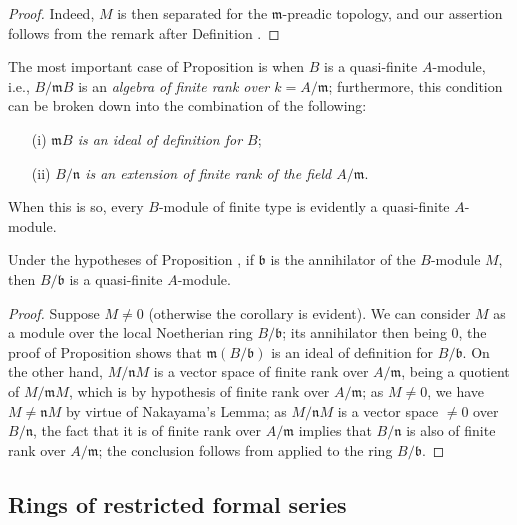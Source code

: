 \begin{proof}
\label{proof-0.7.4.3}
Indeed, $M$ is then separated for the $\mathfrak{m}$-preadic topology, and our assertion
follows from the remark after Definition .
\end{proof}

\begin{env}[7.4.4]
\label{0.7.4.4}
The most important case of Proposition  is when $B$ is a
quasi-finite $A$-module, i.e., $B/\mathfrak{m}B$ is an \emph{algebra of finite rank over
$k=A/\mathfrak{m}$}; furthermore, this condition can be broken down into the combination
of the following:
\begin{enumerate}
  \item[(i)] \emph{$\mathfrak{m}B$ is an ideal of definition for $B$};
  \item[(ii)] \emph{$B/\mathfrak{n}$ is an extension of finite rank of the field $A/\mathfrak{m}$}.
\end{enumerate}
When this is so, every $B$-module of finite type is evidently a quasi-finite $A$-module.
\end{env}

\begin{corollary}[7.4.5]
\label{0.7.4.5}
Under the hypotheses of Proposition , if
$\mathfrak{b}$ is the annihilator of the $B$-module $M$, then $B/\mathfrak{b}$ is a
quasi-finite $A$-module.
\end{corollary}

\begin{proof}
\label{proof-0.7.4.5}
Suppose $M\neq 0$ (otherwise the corollary is evident). We can consider $M$ as a
module over the local Noetherian ring $B/\mathfrak{b}$; its annihilator then being
$0$, the proof of Proposition  shows that
$\mathfrak{m}(B/\mathfrak{b})$ is an ideal of definition for $B/\mathfrak{b}$.
On the other hand, $M/\mathfrak{n}M$ is a vector space of finite rank over
$A/\mathfrak{m}$, being a quotient of $M/\mathfrak{m}M$, which is by hypothesis of
finite rank over $A/\mathfrak{m}$; as $M\neq 0$, we have $M\neq\mathfrak{n}M$ by
virtue of Nakayama's Lemma; as $M/\mathfrak{n}M$ is a vector space $\neq 0$ over
$B/\mathfrak{n}$, the fact that it is of finite rank over $A/\mathfrak{m}$ implies
that $B/\mathfrak{n}$ is also of finite rank over $A/\mathfrak{m}$; the conclusion
follows from  applied to the ring $B/\mathfrak{b}$.
\end{proof}

\subsection{Rings of restricted formal series}
\label{subsection:0.7.5}

